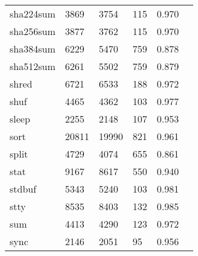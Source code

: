 \begin{longtable}{lp{2.4cm}p{2.4cm}p{2.4cm}p{2.4cm}p{2.4cm}}
sha224sum &                                    3869 &                        3754 &                          115 &                                   0.970 \\
sha256sum &                                    3877 &                        3762 &                          115 &                                   0.970 \\
sha384sum &                                    6229 &                        5470 &                          759 &                                   0.878 \\
sha512sum &                                    6261 &                        5502 &                          759 &                                   0.879 \\
shred     &                                    6721 &                        6533 &                          188 &                                   0.972 \\
shuf      &                                    4465 &                        4362 &                          103 &                                   0.977 \\
sleep     &                                    2255 &                        2148 &                          107 &                                   0.953 \\
sort      &                                   20811 &                       19990 &                          821 &                                   0.961 \\
split     &                                    4729 &                        4074 &                          655 &                                   0.861 \\
stat      &                                    9167 &                        8617 &                          550 &                                   0.940 \\
stdbuf    &                                    5343 &                        5240 &                          103 &                                   0.981 \\
stty      &                                    8535 &                        8403 &                          132 &                                   0.985 \\
sum       &                                    4413 &                        4290 &                          123 &                                   0.972 \\
sync      &                                    2146 &                        2051 &                           95 &                                   0.956 \\

\end{longtable}
